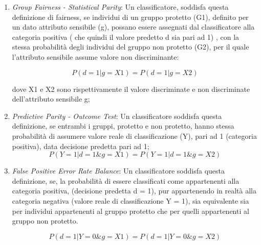  
\begin{enumerate}
     \item \emph{Group Fairness - Statistical Parity}: Un classificatore, soddisfa questa definizione di fairness, se individui di un gruppo protetto (G1), definito per un dato attributo sensibile (g), possano essere assegnati dal classificatore alla categoria positiva ( che quindi il valore predetto d sia pari ad 1) , con la stessa probabilità degli individui del gruppo non protetto (G2), per il quale l'attributo sensibile assume valore non discriminante:
     
     \begin{equation*}
        P(d = 1| g = X1) = P(d = 1 | g = X2)
    \end{equation*}
     
     dove X1 e X2 sono rispettivamente il valore discriminate e non discriminate dell'attributo sensibile g;
    
     \item \emph{Predictive Parity - Outcome Test}: Un classificatore soddisfa questa definizione, se entrambi i gruppi, protetto e non protetto, hanno stessa probabilità di assumere valore reale di classificazione (Y), pari ad 1 (categoria positiva), data decisione predetta pari ad 1;
     \begin{equation*}
        P(Y = 1| d = 1 \& g = X1) = P( Y = 1 | d = 1 \& g = X2)
    \end{equation*}
    
    
     \item \emph{False Positive Error Rate Balance}: Un classificatore soddisfa questa definizione, se, la probabilità di essere classificati come appartenenti alla categoria positiva, (decisione predetta d = 1), pur appartenendo in realtà alla categoria negativa (valore reale di classificazione Y = 1), sia equivalente sia per individui appartenenti al gruppo protetto che per quelli appartenenti al gruppo non protetto.
     
     \begin{equation*}
       P(d = 1| Y = 0 \& g = X1) = P( d = 1 | Y = 0 \& g = X2)
    \end{equation*}
    
     
\end{enumerate}

